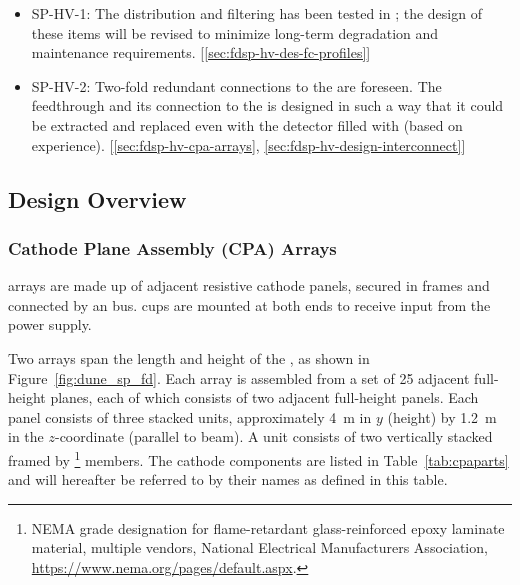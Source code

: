 \begin{itemize}
\item SP-HV-1: The  distribution and filtering has been tested in ; the design of these items will be revised to minimize long-term degradation and maintenance requirements.  [\ref{sec:fdsp-hv-des-fc-profiles}] %
\item SP-HV-2: Two-fold redundant connections to the  are foreseen. The  feedthrough and its connection to the  is designed in such a way that it could be extracted and replaced even with the detector filled with  (based on  experience). [\ref{sec:fdsp-hv-cpa-arrays}, \ref{sec:fdsp-hv-design-interconnect}] %
\end{itemize}
\subsection{Design Overview}
\label{sec:fdsp-hv-des}

\subsubsection{Cathode Plane Assembly (CPA) Arrays}
\label{sec:fdsp-hv-des-cpa}

 arrays are made up of adjacent resistive cathode panels, secured in frames and connected by an  bus.  cups are mounted at both ends to receive input from the power supply.

Two  arrays span the length and height of the , as shown in Figure~\ref{fig:dune_sp_fd}. %
Each array is assembled from a set of \num{25} adjacent full-height  planes, %
each of which consists of two adjacent full-height panels. %
Each panel consists of three stacked units, approximately \SI{4}{\m} in $y$ (height) by \SI{1.2}{\meter} in the $z$-coordinate (parallel to beam). %
A unit consists of two %
vertically stacked  framed by  \frfour\footnote{NEMA grade designation for flame-retardant glass-reinforced epoxy laminate material, multiple vendors, National Electrical Manufacturers Association\texttrademark{},  \url{https://www.nema.org/pages/default.aspx}.} members. 
The  cathode components are listed in Table~\ref{tab:cpaparts} and will hereafter be referred to by their names as defined in this table.

